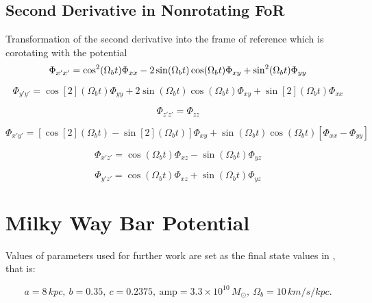 \documentclass[a4paper,11pt]{article}
\begin{document}
		\subsection{Second Derivative in Nonrotating FoR}
			Transformation of the second derivative into the frame of reference which is corotating with the potential\\
		\begin{equation}
			\Phi_{x'x'} = \cos[2](\Omega_b t)\Phi_{xx} - 2 \sin(\Omega_b t) \cos(\Omega_b t)\Phi_{xy} + \sin[2](\Omega_b t)\Phi_{yy}\\
		\end{equation}
		
		\begin{equation}
			\Phi_{y'y'} = \cos[2](\Omega_b t)\Phi_{yy} + 2 \sin(\Omega_b t) \cos(\Omega_b t)\Phi_{xy} + \sin[2](\Omega_b t)\Phi_{xx}
		\end{equation}
		
		\begin{equation}
			\Phi_{z'z'} = \Phi_{zz}
		\end{equation}
		
		\begin{equation}
			\Phi_{x'y'} = [\cos[2](\Omega_b t) - \sin[2](\Omega_b t)]\Phi_{xy} + \sin(\Omega_b t) \cos(\Omega_b t)[\Phi_{xx} - \Phi_{yy}]
		\end{equation}
		
		\begin{equation}
			\Phi_{x'z'} = \cos(\Omega_b t)\Phi_{xz} - \sin(\Omega_b t) \Phi_{yz}
		\end{equation}
		
		\begin{equation}
			\Phi_{y'z'} = \cos(\Omega_b t)\Phi_{xz} + \sin(\Omega_b t) \Phi_{yz}
		\end{equation}	

	\section{Milky Way Bar Potential}
		
		Values of parameters used for further work are set as the final state values in \cite{MachadoManos:2016}, that is:
		
		\begin{equation*}
			a = 8\,kpc,~
			b = 0.35,~
			c = 0.2375,~
			\mathrm{amp} = 3.3 \times 10^{10}\, M_{\odot},~
			\Omega_b = 10\,km/s/kpc.
		\end{equation*}
	
	
		\nocite{*} %
		
		\small{
			\vspace{0.01in}}
		
	
	
\end{document}
